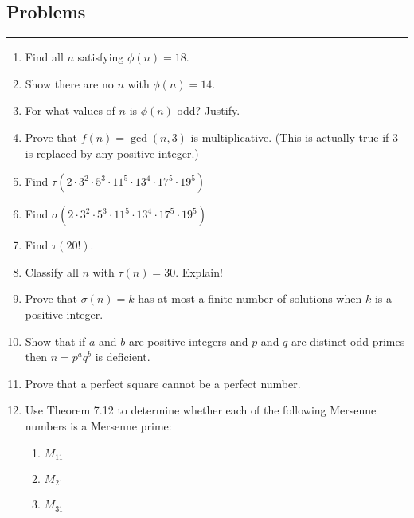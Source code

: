 \documentclass[class=article, crop=false]{standalone}
\begin{document}
\subsection{Problems}
\rule{\textwidth}{1pt}
\begin{enumerate}
\item
  Find all $n$ satisfying $\phi(n)=18$.

\item
  Show there are no $n$ with $\phi(n)=14$.

\item
  For what values of $n$ is $\phi(n)$ odd?
  Justify.

\item
  Prove that $f(n)=\gcd(n,3)$ is multiplicative.
  (This is actually true if 3 is replaced by any positive integer.)

\item
  Find $\tau(2\cdot 3^2\cdot 5^3\cdot 11^5\cdot 13^4\cdot 17^5\cdot 19^5)$
\item
  Find $\sigma(2\cdot 3^2\cdot 5^3\cdot 11^5\cdot 13^4\cdot 17^5\cdot 19^5)$

\item
  Find $\tau(20!)$.

\item
  Classify all $n$ with $\tau(n)=30$. Explain!

\item
  Prove that $\sigma(n)=k$
  has at most a finite number of solutions when $k$ is a positive integer.

\item
  Show that if $a$ and $b$ are positive integers
  and $p$ and $q$ are distinct odd primes
  then $n=p^aq^b$ is deficient.

\item
  Prove that a perfect square cannot be a perfect number.

\item
  Use Theorem 7.12 to determine whether each of the following Mersenne numbers
  is a Mersenne prime:
  \begin{enumerate}
  \item
	$M_{11}$
  \item
	$M_{21}$
  \item
	$M_{31}$
  \end{enumerate}

\end{enumerate}
\end{document}
